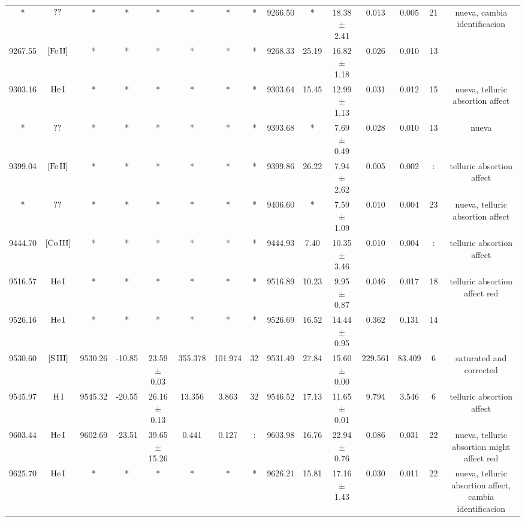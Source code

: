 \documentclass{article}
\begin{document}
\begin{table*}
\begin{adjustbox}{width=\textwidth}
\begin{tabular}{ccccccccccccccc}
* & $\mbox{??}\thinspace \mbox{}$ & * & * & * & * & * & * & 9266.50 & * & 18.38 $\pm$ 2.41 & 0.013 & 0.005 & 21 &  nueva, cambia identificacion \\
9267.55 & $\mbox{[Fe}\thinspace \mbox{II]}$ & * & * & * & * & * & * & 9268.33 & 25.19 & 16.82 $\pm$ 1.18 & 0.026 & 0.010 & 13 &  \\
9303.16 & $\mbox{He}\thinspace \mbox{I}$ & * & * & * & * & * & * & 9303.64 & 15.45 & 12.99 $\pm$ 1.13 & 0.031 & 0.012 & 15 &  nueva, telluric absortion affect \\
* & $\mbox{??}\thinspace \mbox{}$ & * & * & * & * & * & * & 9393.68 & * & 7.69 $\pm$ 0.49 & 0.028 & 0.010 & 13 &  nueva \\
9399.04 & $\mbox{[Fe}\thinspace \mbox{II]}$ & * & * & * & * & * & * & 9399.86 & 26.22 & 7.94 $\pm$ 2.62 & 0.005 & 0.002 & : &  telluric absortion affect \\
* & $\mbox{??}\thinspace \mbox{}$ & * & * & * & * & * & * & 9406.60 & * & 7.59 $\pm$ 1.09 & 0.010 & 0.004 & 23 &  nueva, telluric absortion affect \\
9444.70 & $\mbox{[Co}\thinspace \mbox{III]}$ & * & * & * & * & * & * & 9444.93 & 7.40 & 10.35 $\pm$ 3.46 & 0.010 & 0.004 & : &  telluric absortion affect \\
9516.57 & $\mbox{He}\thinspace \mbox{I}$ & * & * & * & * & * & * & 9516.89 & 10.23 & 9.95 $\pm$ 0.87 & 0.046 & 0.017 & 18 &  telluric absortion affect red \\
9526.16 & $\mbox{He}\thinspace \mbox{I}$ & * & * & * & * & * & * & 9526.69 & 16.52 & 14.44 $\pm$ 0.95 & 0.362 & 0.131 & 14 &  \\
9530.60 & $\mbox{[S}\thinspace \mbox{III]}$ & 9530.26 & -10.85 & 23.59 $\pm$ 0.03 & 355.378 & 101.974 & 32 & 9531.49 & 27.84 & 15.60 $\pm$ 0.00 & 229.561 & 83.409 & 6 &  saturated and corrected \\
9545.97 & $\mbox{H}\thinspace \mbox{I}$ & 9545.32 & -20.55 & 26.16 $\pm$ 0.13 & 13.356 & 3.863 & 32 & 9546.52 & 17.13 & 11.65 $\pm$ 0.01 & 9.794 & 3.546 & 6 &  telluric absortion affect \\
9603.44 & $\mbox{He}\thinspace \mbox{I}$ & 9602.69 & -23.51 & 39.65 $\pm$ 15.26 & 0.441 & 0.127 & : & 9603.98 & 16.76 & 22.94 $\pm$ 0.76 & 0.086 & 0.031 & 22 &  nueva, telluric absortion might affect red \\
9625.70 & $\mbox{He}\thinspace \mbox{I}$ & * & * & * & * & * & * & 9626.21 & 15.81 & 17.16 $\pm$ 1.43 & 0.030 & 0.011 & 22 &  nueva, telluric absortion affect, cambia identificacion \\

\end{tabular}
\end{adjustbox}
\end{table*}
\end{document}
